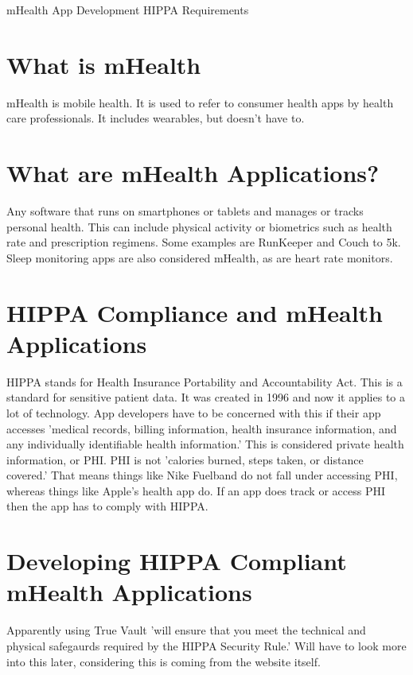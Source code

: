 \documentclass{article}
\begin{document}
\begin{center}
\Huge mHealth App Development HIPPA Requirements
\end{center}
\section*{What is mHealth}
mHealth is mobile health. It is used to refer to consumer health apps by health care professionals. It includes wearables, but doesn't have to.

\section*{What are mHealth Applications?}
Any software that runs on smartphones or tablets and manages or tracks personal health. This can include physical activity or biometrics such as health rate and prescription regimens. Some examples are RunKeeper and Couch to 5k. Sleep monitoring apps are also considered mHealth, as are heart rate monitors. 

\section*{HIPPA Compliance and mHealth Applications}
HIPPA stands for Health Insurance Portability and Accountability Act. This is a standard for sensitive patient data. It was created in 1996 and now it applies to a lot of technology. App developers have to be concerned with this if their app accesses 'medical records, billing information, health insurance information, and any individually identifiable health information.' This is considered private health information, or PHI. PHI is not 'calories burned, steps taken, or distance covered.' That means things like Nike Fuelband do not fall under accessing PHI, whereas things like Apple's health app do. If an app does track or access PHI then the app has to comply with HIPPA. 

\section*{Developing HIPPA Compliant mHealth Applications}
Apparently using True Vault 'will ensure that you meet the technical and physical safegaurds required by the HIPPA Security Rule.' Will have to look more into this later, considering this is coming from the website itself. 
\end{document}
